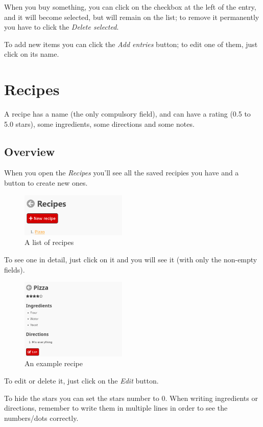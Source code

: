 \documentclass[12pt, a4paper]{report}
\begin{document}
    When you buy something, you can click on the checkbox at the left of the entry, and it will become selected, but will remain on the list;
    to remove it permanently you have to click the \emph{Delete selected}.

    To add new items you can click the \emph{Add entries} button; to edit one of them, just click on its name.



    \chapter{Recipes}

    A recipe has a name (the only compulsory field), and can have a rating (0.5 to 5.0 stars), some ingredients, some directions and some notes.

    \section{Overview}

    When you open the \emph{Recipes} you'll see all the saved recipies you have and a button to create new ones.

    \begin{figure}[H]
        \centering
        \includegraphics[width=0.45\textwidth]{assets/en/recipes.png}
        \caption{A list of recipes}
    \end{figure}

    To see one in detail, just click on it and you will see it (with only the non-empty fields).

    \begin{figure}[H]
        \centering
        \includegraphics[width=0.45\textwidth]{assets/en/recipe.png}
        \caption{An example recipe}
    \end{figure}

    To edit or delete it, just click on the \emph{Edit} button.

    To hide the stars you can set the stars number to 0. When writing ingredients or directions, remember to write them in multiple lines in order
    to see the numbers/dots correctly.
\end{document}
